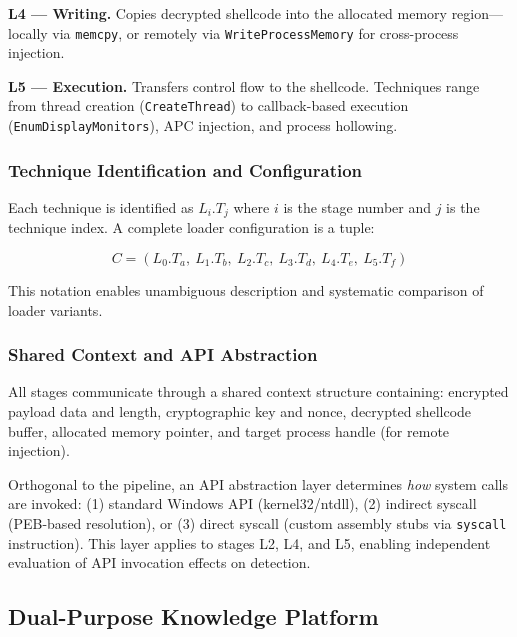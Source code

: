\documentclass[10pt,a4paper,twocolumn]{article}
\begin{document}
\textbf{L4 --- Writing.}
Copies decrypted shellcode into the allocated memory region---locally via \texttt{memcpy}, or remotely via \texttt{WriteProcessMemory} for cross-process injection.

\textbf{L5 --- Execution.}
Transfers control flow to the shellcode.
Techniques range from thread creation (\texttt{CreateThread}) to callback-based execution (\texttt{EnumDisplayMonitors}), APC injection, and process hollowing.

\subsubsection{Technique Identification and Configuration}

Each technique is identified as $L_i.T_j$ where $i$ is the stage number and $j$ is the technique index.
A complete loader configuration is a tuple:

\begin{equation}
    C = (L_0.T_a,\ L_1.T_b,\ L_2.T_c,\ L_3.T_d,\ L_4.T_e,\ L_5.T_f)
    \label{eq:config}
\end{equation}

This notation enables unambiguous description and systematic comparison of loader variants.

\subsubsection{Shared Context and API Abstraction}

All stages communicate through a shared context structure containing: encrypted payload data and length, cryptographic key and nonce, decrypted shellcode buffer, allocated memory pointer, and target process handle (for remote injection).

Orthogonal to the pipeline, an API abstraction layer determines \textit{how} system calls are invoked: (1) standard Windows API (kernel32/ntdll), (2) indirect syscall (PEB-based resolution), or (3) direct syscall (custom assembly stubs via \texttt{syscall} instruction).
This layer applies to stages L2, L4, and L5, enabling independent evaluation of API invocation effects on detection.

\subsection{Dual-Purpose Knowledge Platform}
\end{document}
